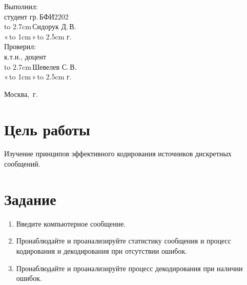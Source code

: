 \documentclass[14pt]{extarticle}
\makeatletter
\newcommand{\hrf}[1]{\hbox to #1{\hrulefill}} %
\newcounter{sectionc} %
\newcommand{\numbersections}{\renewcommand{\Hy@numberline}[1]{##1~}}
\newcommand{\nonumbersections}{\renewcommand{\Hy@numberline}[1]{}}
\let\oldsection\section
\renewcommand{\section}{\numbersections\oldsection}
\let\oldsectionc\sectionc
\renewcommand{\sectionc}{\nonumbersections\oldsectionc}
\renewcommand\tableofcontents{
	\pdfbookmark[sectionc]{\contentsname}{toc} %
	\sectionc*{\contentsname
		\@mkboth{\contentsname}{\contentsname}}
	\@starttoc{toc}
}
\makeatother
\begin{document}
\vfill %

\hfill %
\begin{minipage}{0.45\textwidth} %
	Выполнил:\\[2mm]
	студент гр.\,БФИ2202\\[2mm]
	\hrf{2.7cm}\,Сидорук Д.\,В.\\[2mm]
	«\,\hrf{1cm}\,»\,\hrf{2.5cm}\,\the\year{}\,г.\\[5mm]
	
	Проверил:\\[2mm]
	к.т.н., доцент\\[2mm]
	\hrf{2.7cm}\,Шевелев С.\,В.\\[2mm]
	«\,\hrf{1cm}\,»\,\hrf{2.5cm}\,\the\year{}\,г.
\end{minipage}%

\vfill

\centerline{Москва, \the\year{}\,г.} %
\thispagestyle{empty} %
\newpage %
\tableofcontents %
\newpage %

\section{Цель работы}

Изучение принципов эффективного кодирования источников дискретных сообщений.

\section{Задание}

\begin{enumerate}
    \item Введите компьютерное сообщение.
    \item Пронаблюдайте и проанализируйте статистику сообщения и процесс кодирования и декодирования при отсутствии ошибок.
    \item Пронаблюдайте и проанализируйте процесс декодирования при наличии ошибок.
\end{enumerate}
\end{document}
